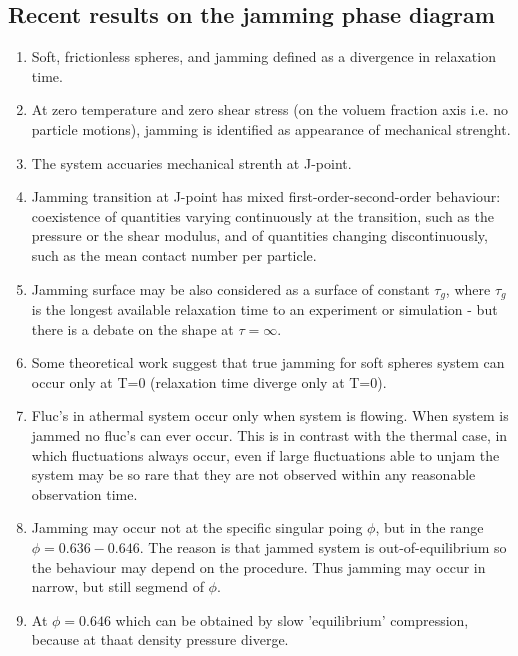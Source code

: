 \documentclass[10pt,a4paper]{article}
\begin{document}
\subsection{Recent results on the jamming phase diagram \cite{con:10}}
\begin{enumerate}
 \item Soft, frictionless spheres, and jamming defined as a divergence in relaxation time.
 \item At zero temperature and zero shear stress (on the voluem fraction axis i.e. no particle motions), jamming is identified as appearance of mechanical strenght.
 \item The system accuaries mechanical strenth at J-point.
 \item Jamming transition at J-point has mixed first-order-second-order behaviour:
 coexistence of quantities varying continuously at the transition, such as the pressure or the shear modulus, 
 and of quantities changing discontinuously, such as the mean contact number per particle. 
 \item Jamming surface may be also considered as a surface of constant $\tau_g$, where $\tau_g$ is the longest available
 relaxation time to an experiment or simulation - but there is a debate on the shape at $\tau=\infty$.
 \item Some theoretical work suggest that true jamming for soft spheres system can occur only at T=0 (relaxation time diverge only at T=0).
 \item Fluc's in athermal system occur only when system is flowing. When system is jammed no fluc's can ever occur. This is in contrast with the
thermal case, in which fluctuations always occur, even if large fluctuations able to unjam the system may be so rare that they are not observed within any reasonable observation time.
 \item Jamming may occur not at the specific singular poing $\phi$, but in the range $\phi=0.636-0.646$. The reason is that jammed system is
 out-of-equilibrium so the behaviour may depend on the procedure. Thus jamming may occur in narrow, but still segmend of $\phi$.
 \item At $\phi=0.646$ which can be obtained by slow 'equilibrium' compression, because at thaat density pressure diverge.
\end{enumerate}
\end{document}
